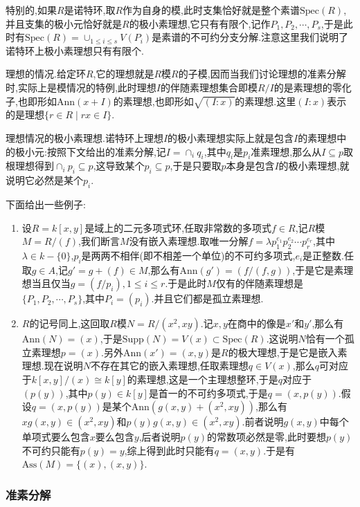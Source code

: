 特别的,如果$R$是诺特环,取$R$作为自身的模,此时支集恰好就是整个素谱$\mathrm{Spec}(R)$,并且支集的极小元恰好就是$R$的极小素理想,它只有有限个,记作$P_1,P_2,\cdots,P_s$,于是此时有$\mathrm{Spec}(R)=\cup_{1\le i\le s}V(P_i)$是素谱的不可约分支分解.注意这里我们说明了诺特环上极小素理想只有有限个.

理想的情况.给定环$R$,它的理想就是$R$模$R$的子模,因而当我们讨论理想的准素分解时,实际上是模情况的特例,此时理想$I$的伴随素理想集合即模$R/I$的是素理想的零化子,也即形如$\mathrm{Ann}(x+I)$的素理想,也即形如$\sqrt{(I:x)}$的素理想.这里$(I:x)$表示的是理想$\{r\in R\mid rx\in I\}$.

理想情况的极小素理想.诺特环上理想$I$的极小素理想实际上就是包含$I$的素理想中的极小元:按照下文给出的准素分解,记$I=\cap_iq_i$,其中$q_i$是$p_i$准素理想,那么从$I\subseteq p$取根理想得到$\cap_ip_i\subseteq p$,这导致某个$p_i\subseteq p$,于是只要取$p$本身是包含$I$的极小素理想,就说明它必然是某个$p_i$.

下面给出一些例子:
\begin{enumerate}
	\item 设$R=k[x,y]$是域上的二元多项式环,任取非常数的多项式$f\in R$,记$R$模$M=R/(f)$,我们断言$M$没有嵌入素理想.取唯一分解$f=\lambda p_1^{e_1}p_2^{e_2}\cdots p_r^{e_r}$,其中$\lambda\in k-\{0\}$,$p_i$是两两不相伴(即不相差一个单位)的不可约多项式,$e_i$是正整数.任取$g\in A$,记$g'=g+(f)\in M$,那么有$\mathrm{Ann}(g')=(f/(f,g))$,于是它是素理想当且仅当$g=(f/p_i),1\le i\le r$.于是此时$M$仅有的伴随素理想是$\{P_1,P_2,\cdots,P_s\}$,其中$P_i=(p_i)$.并且它们都是孤立素理想.
	\item $R$的记号同上,这回取$R$模$N=R/(x^2,xy)$.记$x,y$在商中的像是$x'$和$y'$,那么有$\mathrm{Ann}(N)=(x)$,于是$\mathrm{Supp}(N)=V(x)\subset\mathrm{Spec}(R)$.这说明$N$恰有一个孤立素理想$p=(x)$.另外$\mathrm{Ann}(x')=(x,y)$是$R$的极大理想,于是它是嵌入素理想.现在说明$N$不存在其它的嵌入素理想,任取素理想$q\in V(x)$,那么$q$可对应于$k[x,y]/(x)\cong k[y]$的素理想,这是一个主理想整环,于是$q$对应于$(p(y))$,其中$p(y)\in k[y]$是首一的不可约多项式,于是$q=(x,p(y))$.假设$q=(x,p(y))$是某个$\mathrm{Ann}(g(x,y)+(x^2,xy))$,那么有$xg(x,y)\in (x^2,xy)$和$p(y)g(x,y)\in (x^2,xy)$.前者说明$g(x,y)$中每个单项式要么包含$x$要么包含$y$,后者说明$p(y)$的常数项必然是零,此时要想$p(y)$不可约只能有$p(y)=y$,综上得到此时只能有$q=(x,y)$.于是有$\mathrm{Ass}(M)=\{(x),(x,y)\}$.
\end{enumerate}
\subsubsection{准素分解}

